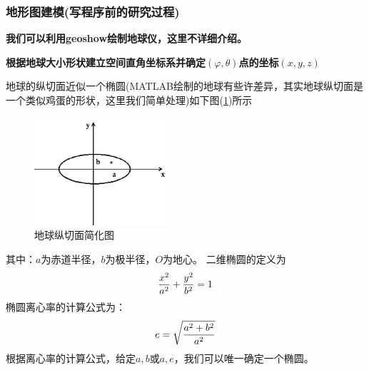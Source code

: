         \subsubsection{地形图建模(写程序前的研究过程)}
            \par
            \checkmark \textbf {我们可以利用geoshow绘制地球仪，这里不详细介绍。}
            \par
            \checkmark \textbf {根据地球大小形状建立空间直角坐标系并确定$(\varphi,\theta)$点的坐标$(x,y,z)$}
            \par
            地球的纵切面近似一个椭圆(MATLAB绘制的地球有些许差异，其实地球纵切面是一个类似鸡蛋的形状，这里我们简单处理)如下图(\ref{fig:地球纵切面简化图})所示
            \begin{figure}[H]
            \centering
            \includegraphics[height=4cm]{images/4.png}
            \caption{地球纵切面简化图}
            \label{fig:地球纵切面简化图}
            \end{figure}
            \noindent 其中：$a$为赤道半径，$b$为极半径，$O$为地心。
            二维椭圆的定义为
            \begin{equation*}
            \centering
            \frac {x^2}{a^2}+\frac{y^2}{b^2}= 1
            \end{equation*}
            椭圆离心率的计算公式为：
            \begin{equation*}
            \centering
            e= \sqrt{\frac {a^2+b^2}{a^2}}
             \end{equation*}
            根据离心率的计算公式，给定$a,b$或$a,e$，我们可以唯一确定一个椭圆。
            \par
